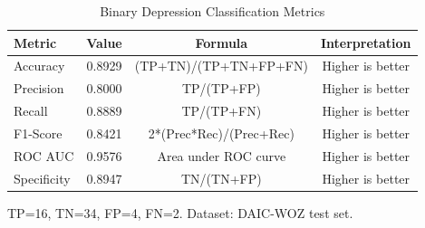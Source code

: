 \begin{table}[h]
\centering
\caption{Binary Depression Classification Metrics}
\label{tab:classification_metrics}
\begin{tabular}{lccc}
\hline
\textbf{Metric} & \textbf{Value} & \textbf{Formula} & \textbf{Interpretation} \\
\hline
Accuracy & 0.8929 & (TP+TN)/(TP+TN+FP+FN) & Higher is better \\
Precision & 0.8000 & TP/(TP+FP) & Higher is better \\
Recall & 0.8889 & TP/(TP+FN) & Higher is better \\
F1-Score & 0.8421 & 2*(Prec*Rec)/(Prec+Rec) & Higher is better \\
ROC AUC & 0.9576 & Area under ROC curve & Higher is better \\
Specificity & 0.8947 & TN/(TN+FP) & Higher is better \\
\hline
\end{tabular}
\begin{tablenotes}
\small
\item TP=16, TN=34, FP=4, FN=2. Dataset: DAIC-WOZ test set.
\end{tablenotes}
\end{table}

